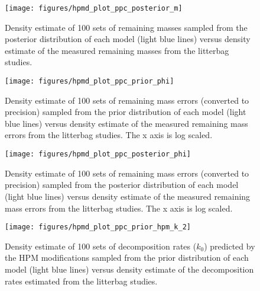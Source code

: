 \documentclass[
  12pt,
]{article}
\begin{document}
\begin{figure}[H]

{\centering \texttt{[image: figures/hpmd\_plot\_ppc\_posterior\_m]} 

}

\caption{Density estimate of 100 sets of remaining masses sampled from the posterior distribution of each model (light blue lines) versus density estimate of the measured remaining masses from the litterbag studies.}\label{fig:sup-hpmd-plot-ppc-posterior-m}
\end{figure}



\begin{figure}[H]

{\centering \texttt{[image: figures/hpmd\_plot\_ppc\_prior\_phi]} 

}

\caption{Density estimate of 100 sets of remaining mass errors (converted to precision) sampled from the prior distribution of each model (light blue lines) versus density estimate of the measured remaining mass errors from the litterbag studies. The x axis is log scaled.}\label{fig:sup-hpmd-plot-ppc-prior-phi}
\end{figure}



\begin{figure}[H]

{\centering \texttt{[image: figures/hpmd\_plot\_ppc\_posterior\_phi]} 

}

\caption{Density estimate of 100 sets of remaining mass errors (converted to precision) sampled from the posterior distribution of each model (light blue lines) versus density estimate of the measured remaining mass errors from the litterbag studies. The x axis is log scaled.}\label{fig:sup-hpmd-plot-ppc-posterior-phi}
\end{figure}



\begin{figure}[H]

{\centering \texttt{[image: figures/hpmd\_plot\_ppc\_prior\_hpm\_k\_2]} 

}

\caption{Density estimate of 100 sets of decomposition rates (\(k_0\)) predicted by the HPM modifications sampled from the prior distribution of each model (light blue lines) versus density estimate of the decomposition rates estimated from the litterbag studies.}\label{fig:sup-hpmd-plot-ppc-prior-hpm-k-2}
\end{figure}
\end{document}
